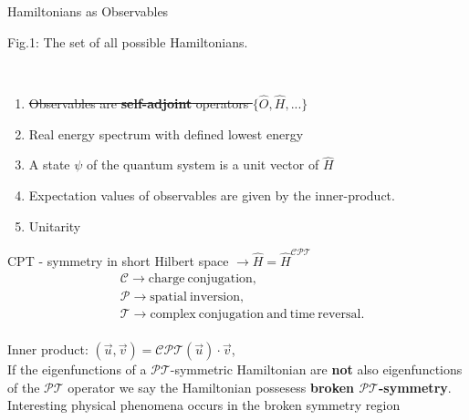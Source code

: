 \documentclass[10pt]{beamer}
\begin{document}
\begin{frame}{Hamiltonians as Observables}
    \\
    \hspace{1em}
    \begin{tiny}
        Fig.1: The set of all possible Hamiltonians.
    \end{tiny}
    \\
    \begin{enumerate}
        \item \textcolor{myNewColorA}{\st{Observables are \textbf{self-adjoint} operators $\{\hat{O}, \hat{H}, ...\}$}}
        \item \textcolor{myNewColorC}{Real energy spectrum with defined lowest energy}
        \item \textcolor{myNewColorC}{A state $\psi$ of the quantum system is a unit vector of $\hat{H}$}
        \item \textcolor{myNewColorC}{Expectation values of observables are given by the inner-product.}
        \item \textcolor{myNewColorC}{Unitarity}
    \end{enumerate}
\end{frame}


\begin{frame}{CPT - symmetry in short}
    \vspace{-1cm}
    Hilbert space $\rightarrow \hat{H} = \hat{H}^{\mathcal{CPT}}$ \\
    \vspace{-0.4cm}
    \begin{align*}
        & \mathcal{C} \rightarrow \mathrm{charge\:conjugation},\\
        & \mathcal{P} \rightarrow \mathrm{spatial\:inversion},\\
        & \mathcal{T} \rightarrow \mathrm{complex\:conjugation\:and\:time\:reversal}.
    \end{align*}\\
    \vspace{0.5cm}
    Inner product: $(\vec{u}, \vec{v}) = \mathcal{CPT}(\vec{u})\cdot\vec{v}$,\\
    \vspace{0.5cm}
    If the eigenfunctions of a $\mathcal{PT}$-symmetric Hamiltonian are \textbf{not} also eigenfunctions of the $\mathcal{PT}$ operator we say the Hamiltonian possesess \textbf{broken $\mathcal{PT}$-symmetry}.\\
    \pause
    \vspace{0.5cm}
    Interesting physical phenomena occurs in the broken symmetry region
\end{frame}
\end{document}
